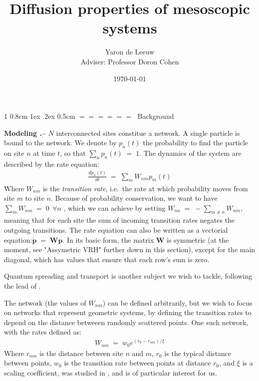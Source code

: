 \documentclass[onecolumn,fleqn,notitlepage,secnumarabic]{revtex4}
\makeatletter
\def\section{%
  \@startsection
    {section}%
    {1}%
    {\z@}%
    {0.8cm \@plus1ex \@minus .2ex}%
    {0.5cm}%
    {\Large\bf $=\!=\!=\!=\!=\!=\;$}%
}%
\makeatother
\begin{document}
\title{Diffusion properties of mesoscopic systems}

\author{Yaron de Leeuw \\ Adviser: Professor Doron Cohen}
\date{\today}
\maketitle


\section{Background}


{ \bf Modeling .-- } $N$ interconnected sites constitue a network. A single particle is bound to the network. We denote by $p_n(t)$ the probability to find the particle on site $n$ at time $t$, so that $\sum_n p_n(t) \;=\;1$. The dynamics of the system are described by the rate equation:
\begin{align}
\frac{dp_n(t)}{dt} \;=\; \sum_m W_{nm}p_m(t)
\end{align}
Where $W_{nm}$ is the \emph{transition rate}, i.e.\ the rate at which probability moves from site $m$ to site $n$.
Because of probability conservation, we want to have $\sum_m W_{nm} \;=\; 0 \ \ \forall n$ , which we can achieve by setting $W_{nn} \;=\; -\sum_{m\ne n} W_{nm} $, meaning that for each site the sum of incoming transition rates negates the outgoing transitions.
The rate equation can also be written as a vectorial equation:$\boldsymbol{ \dot p } \;=\; \boldsymbol{W} \boldsymbol{p}$. In its basic form, the matrix $\boldsymbol{W}$ is symmetric (at the moment, see "Assymetric VRH" further down in this section), except for the main diagonal, which has values that ensure that each row's sum is zero.

Quantum spreading and transport is another subject we wish to tackle, following the lead of \cite{Jayannavar:1991}\cite{Guarneri:1989}\cite{Guarneri:1993}.

The network (the values of $W_{nm}$) can be defined arbitrarily, but we wish to focus on networks that represent geometric systems, by defining the transition rates to depend on the distance betweeen randomly scattered points\cite{Mezard:1999:NPB}. One such network, with the rates defined as:
\begin{align} \label{eq:exp_rates}
  W_{nm}\;=\; w_0 e^{(r_0-r_{nm})/ \xi}
\end{align}
Where $r_{nm}$ is the distance between site $n$ and $m$, $r_0$ is the typical distance between points, $w_0$ is the transition rate between points at distance $r_0$, and $\xi$ is a scaling coefficient, was studied in \cite{Amir:2010:PRL}, and is of particular interest for us.
\end{document}
